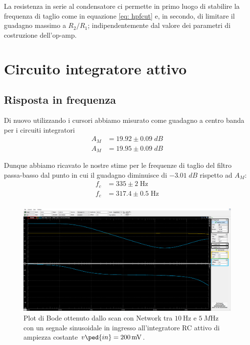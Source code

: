\documentclass[10pt, a4paper, italian]{article}
\begin{document}
La resistenza in serie al condensatore ci permette in primo luogo di
stabilire la frequenza di taglio come in equazione \eqref{eq: hpfcut} e,
in secondo, di limitare il guadagno massimo a $R_2/R_1$;
indipendentemente dal valore dei parametri di costruzione dell'op-amp.

\section{Circuito integratore attivo}
\subsection{Risposta in frequenza}
Di nuovo utilizzando i cursori abbiamo misurato come guadagno a centro banda
per i circuiti integratori
\begin{align*}
A_M &= 19.92 \pm 0.09 \; \si{dB} \\
A_M &= 19.95 \pm 0.09 \; \si{dB}
\end{align*}

Dunque abbiamo ricavato le nostre stime per le frequenze di taglio del filtro
passa-basso dal punto in cui il guadagno diminuisce di $-3.01 \; \si{dB}$
rispetto ad $A_M$:
\begin{align*}
f_c &= 335 \pm 2 \; \si{\Hz} \\
f_c &= 317.4 \pm 0.5 \; \si{\Hz} \\
\end{align*}

\begin{figure}[htbp]
\centering
\includegraphics[scale=0.335]{lpfbode}
\caption{Plot di Bode ottenuto dallo scan con Network tra $\SI{10}{\Hz}$ e
$\SI{5}{M\Hz}$ con un segnale sinusoidale in ingresso all'integratore RC
attivo di ampiezza costante $v\ped{in} = \SI{200}{m\V}$.
\label{fig: intbode}}
\end{figure}
\end{document}
